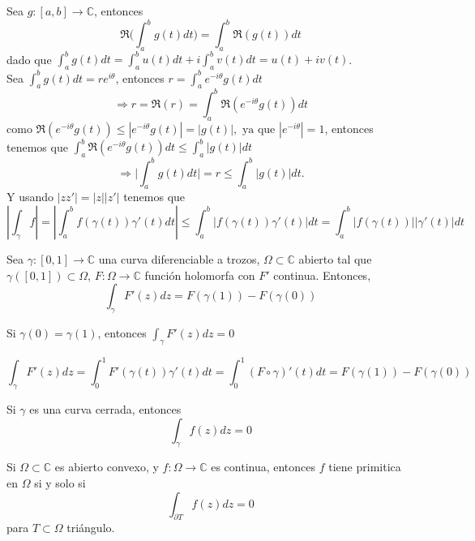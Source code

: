 \begin{dem}
  Sea $g: [a, b] \to \mathbb{C}$, entonces
  \[ 
    \Re \Bigg ( \int_{a}^{b} g(t) dt \Bigg ) = \int_{a}^{b} \Re (g(t)) dt 
  \] 
  dado que $ \int_{a}^{b} g(t) dt = \int_{a}^{b} u(t) dt + i \int_{a}^{b} v(t) dt = u(t) + i v(t)$. \\

  Sea $\int_{a}^{b} g(t) dt = r e^{i \theta}$, entonces $r = \int_{a}^{b} e^{-i \theta} g(t) dt$
  \[ 
    \Rightarrow r = \Re (r) = \int_{a}^{b} \Re (e^{-i \theta} g(t)) dt 
  \] 
  como $\Re (e^{-i \theta} g(t) ) \leq | e^{-i \theta} g(t) | = | g(t) |, \text{ ya que } | e^{-i \theta} | = 1$, entonces tenemos que $\int_{a}^{b} \Re (e^{-i \theta} g(t)) dt \leq \int_{a}^{b} | g(t) | dt$
  \[ 
    \Rightarrow \Bigg | \int_{a}^{b} g(t) dt \Bigg | = r \leq \int_{a}^{b} | g(t) | dt. 
  \] 
  Y usando $| z z' | = | z || z' |$ tenemos que
  \[ 
    | \int_{\gamma}^{} f | = |  \int_{a}^{b} f(\gamma(t))\gamma'(t) dt | \leq \int_{a}^{b} | f(\gamma(t))\gamma'(t) | dt = \int_{a}^{b} | f(\gamma(t)) || \gamma'(t) | dt
  \] 
\end{dem}

\begin{theo}
  Sea $\gamma: [0,1] \to \mathbb{C}$ una curva diferenciable a trozos, $\Omega \subset \mathbb{C}$ abierto tal que $\gamma([0,1]) \subset \Omega$, $F: \Omega \to \mathbb{C}$ función holomorfa con $F'$ continua. Entonces,
  \[ 
    \int_{\gamma}^{} F'(z) dz = F(\gamma(1)) - F(\gamma(0)) 
  \] 
\end{theo}

\begin{obs}
  Si $\gamma(0) = \gamma(1)$, entonces $\int_{\gamma}^{} F'(z) dz = 0$
\end{obs}

\begin{dem}
  \[ 
    \int_{\gamma}^{} F'(z) dz = \int_{0}^{1} F'(\gamma(t))\gamma'(t) dt = \int_{0}^{1} (F \circ \gamma)'(t) dt = F(\gamma(1)) - F(\gamma(0))
  \] 
\end{dem}

\begin{cor}
  Si $\gamma$ es una curva cerrada, entonces
  \[ 
    \int_{\gamma}^{} f(z) dz= 0 
  \] 
\end{cor}

\begin{theo}
  Si $\Omega \subset \mathbb{C}$ es abierto convexo, y $f: \Omega \to \mathbb{C}$ es continua, entonces $f$ tiene primitica en $ \Omega$ si y solo si 
  \[ 
    \int_{\partial T}^{} f(z) dz = 0
  \] 
  para $T \subset \Omega$ triángulo.
\end{theo}

